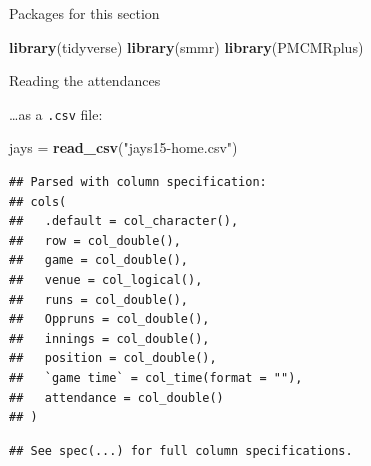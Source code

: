 \documentclass[ignorenonframetext,]{beamer}
\newenvironment{Shaded}{\begin{snugshade}}{\end{snugshade}}
\newcommand{\KeywordTok}[1]{\textcolor[rgb]{0.13,0.29,0.53}{\textbf{#1}}}
\newcommand{\NormalTok}[1]{#1}
\newcommand{\StringTok}[1]{\textcolor[rgb]{0.31,0.60,0.02}{#1}}
\begin{document}
\begin{frame}[fragile]{Packages for this section}
\protect\hypertarget{packages-for-this-section-3}{}

\begin{Shaded}
\begin{Highlighting}[]
\KeywordTok{library}\NormalTok{(tidyverse)}
\KeywordTok{library}\NormalTok{(smmr)}
\KeywordTok{library}\NormalTok{(PMCMRplus)}
\end{Highlighting}
\end{Shaded}

\end{frame}

\begin{frame}[fragile]{Reading the attendances}
\protect\hypertarget{reading-the-attendances}{}

\ldots{}as a \texttt{.csv} file:

\begin{Shaded}
\begin{Highlighting}[]
\NormalTok{jays =}\StringTok{ }\KeywordTok{read_csv}\NormalTok{(}\StringTok{"jays15-home.csv"}\NormalTok{)}
\end{Highlighting}
\end{Shaded}

\begin{verbatim}
## Parsed with column specification:
## cols(
##   .default = col_character(),
##   row = col_double(),
##   game = col_double(),
##   venue = col_logical(),
##   runs = col_double(),
##   Oppruns = col_double(),
##   innings = col_double(),
##   position = col_double(),
##   `game time` = col_time(format = ""),
##   attendance = col_double()
## )
\end{verbatim}

\begin{verbatim}
## See spec(...) for full column specifications.
\end{verbatim}

\end{frame}
\end{document}
